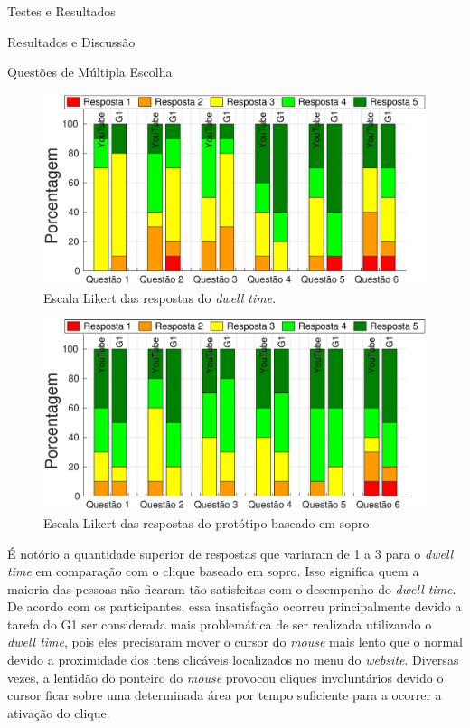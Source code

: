 \begin{chapter}{Testes e Resultados}
\begin{section}{Resultados e Discussão}
\begin{subsection}{Questões de Múltipla Escolha}
\begin{figure}[!h]
	\centering
	\begin{minipage}[c]{\textwidth}
	\centering
	\includegraphics[width=0.95\linewidth]{fig/DwellQuestions}
	\caption{Escala Likert das respostas do \textit{dwell time}.} 
	\label{fig:DwellQuestions}
	\end{minipage}
\end{figure}

\begin{figure}[!h]
	\centering
	\begin{minipage}[c]{\textwidth}
	\centering
	\includegraphics[width=0.95\linewidth]{fig/PuffQuestions}
	\caption{Escala Likert das respostas do protótipo baseado em sopro.}
	\label{fig:PuffQuestions}
	\end{minipage}
\end{figure}



É notório a quantidade superior de respostas que variaram de 1 a 3 para o
\textit{dwell time} em comparação com o clique baseado em sopro. Isso significa
quem a maioria das pessoas não ficaram tão satisfeitas com o desempenho do
\textit{dwell time}. De acordo com os participantes, essa insatisfação ocorreu
principalmente devido a tarefa do G1 ser considerada mais problemática de ser
realizada utilizando o \textit{dwell time}, pois eles precisaram mover o
cursor do \textit{mouse} mais lento que o normal devido a proximidade dos itens
clicáveis localizados no menu do \textit{website}. Diversas vezes, a lentidão do
ponteiro do \textit{mouse} provocou cliques involuntários devido o cursor ficar
sobre uma determinada área por tempo suficiente para a ocorrer a ativação do
clique.


\end{subsection}
\end{section}
\end{chapter}
